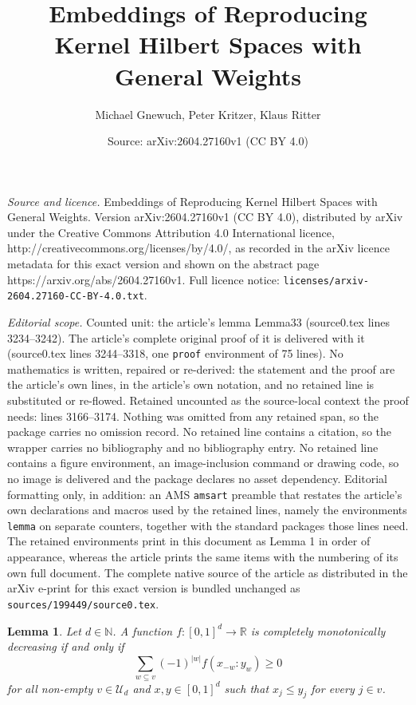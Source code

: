 \documentclass[10pt,a4paper]{amsart}
\title{Embeddings of Reproducing Kernel Hilbert Spaces with General Weights}
\author{Michael Gnewuch, Peter Kritzer, Klaus Ritter}
\date{Source: arXiv:2604.27160v1 (CC BY 4.0)}
\newtheorem{lemma}{Lemma}
\newcommand{\N}  {{\mathbb N}}
\newcommand{\R}  {{\mathbb R}}
\newcommand{\U}  {\mathcal{U}}
\begin{document}
\maketitle

\noindent\emph{Source and licence.} Embeddings of Reproducing Kernel Hilbert Spaces with General Weights. Version arXiv:2604.27160v1 (CC BY 4.0), distributed by arXiv under the Creative Commons Attribution 4.0 International licence, http://creativecommons.org/licenses/by/4.0/, as recorded in the arXiv licence metadata for this exact version and shown on the abstract page https://arxiv.org/abs/2604.27160v1. Full licence notice: \texttt{licenses/arxiv-2604.27160-CC-BY-4.0.txt}.\par\smallskip

\noindent\textit{Editorial scope.} Counted unit: the article's lemma Lemma33 (source0.tex lines 3234--3242). The article's complete original proof of it is delivered with it (source0.tex lines 3244--3318, one \texttt{proof} environment of 75 lines). No mathematics is written, repaired or re-derived: the statement and the proof are the article's own lines, in the article's own notation, and no retained line is substituted or re-flowed.  Retained uncounted as the source-local context the proof needs: lines 3166--3174.  Nothing was omitted from any retained span, so the package carries no omission record.  No retained line contains a citation, so the wrapper carries no bibliography and no bibliography entry.  No retained line contains a figure environment, an image-inclusion command or drawing code, so no image is delivered and the package declares no asset dependency.  Editorial formatting only, in addition: an AMS \texttt{amsart} preamble that restates the article's own declarations and macros used by the retained lines, namely the environments \texttt{lemma} on separate counters, together with the standard packages those lines need.  The retained environments print in this document as Lemma 1 in order of appearance, whereas the article prints the same items with the numbering of its own full document.  The complete native source of the article as distributed in the arXiv e-print for this exact version is bundled unchanged as \texttt{sources/199449/source0.tex}.
\begin{lemma}\label{Lemma32}
Let $d\in\N$. A function $f \colon [0,1]^d \to \R$ is 
completely monotonically decreasing if and only if 
\[
\sum_{w \subseteq v} (-1)^{|w|} f(x_{-w}\!:\!y_w)\ge 0
\]
for all non-empty $v\in \U_d$ and 
$x, y\in [0,1]^d$ such that $x_j \leq y_j$ for every $j \in v$.
\end{lemma}
\end{document}
